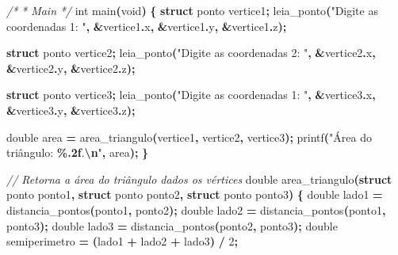 \documentclass[
  11pt,
  a4paper,
]{scrbook}
\newenvironment{Shaded}{\begin{snugshade}}{\end{snugshade}}
\newcommand{\CommentTok}[1]{\textcolor[rgb]{0.56,0.35,0.01}{\textit{#1}}}
\newcommand{\DataTypeTok}[1]{\textcolor[rgb]{0.13,0.29,0.53}{#1}}
\newcommand{\DecValTok}[1]{\textcolor[rgb]{0.00,0.00,0.81}{#1}}
\newcommand{\KeywordTok}[1]{\textcolor[rgb]{0.13,0.29,0.53}{\textbf{#1}}}
\newcommand{\NormalTok}[1]{#1}
\newcommand{\OperatorTok}[1]{\textcolor[rgb]{0.81,0.36,0.00}{\textbf{#1}}}
\newcommand{\SpecialCharTok}[1]{\textcolor[rgb]{0.81,0.36,0.00}{\textbf{#1}}}
\newcommand{\StringTok}[1]{\textcolor[rgb]{0.31,0.60,0.02}{#1}}
\begin{document}
\begin{Shaded}
\begin{Highlighting}[]
\CommentTok{/*}
\CommentTok{ * Main}
\CommentTok{ */}
\DataTypeTok{int}\NormalTok{ main}\OperatorTok{(}\DataTypeTok{void}\OperatorTok{)} \OperatorTok{\{}
    \KeywordTok{struct}\NormalTok{ ponto vertice1}\OperatorTok{;}
\NormalTok{    leia\_ponto}\OperatorTok{(}\StringTok{"Digite as coordenadas 1: "}\OperatorTok{,} \OperatorTok{\&}\NormalTok{vertice1}\OperatorTok{.}\NormalTok{x}\OperatorTok{,} \OperatorTok{\&}\NormalTok{vertice1}\OperatorTok{.}\NormalTok{y}\OperatorTok{,}
               \OperatorTok{\&}\NormalTok{vertice1}\OperatorTok{.}\NormalTok{z}\OperatorTok{);}

    \KeywordTok{struct}\NormalTok{ ponto vertice2}\OperatorTok{;}
\NormalTok{    leia\_ponto}\OperatorTok{(}\StringTok{"Digite as coordenadas 2: "}\OperatorTok{,} \OperatorTok{\&}\NormalTok{vertice2}\OperatorTok{.}\NormalTok{x}\OperatorTok{,} \OperatorTok{\&}\NormalTok{vertice2}\OperatorTok{.}\NormalTok{y}\OperatorTok{,}
               \OperatorTok{\&}\NormalTok{vertice2}\OperatorTok{.}\NormalTok{z}\OperatorTok{);}

    \KeywordTok{struct}\NormalTok{ ponto vertice3}\OperatorTok{;}
\NormalTok{    leia\_ponto}\OperatorTok{(}\StringTok{"Digite as coordenadas 1: "}\OperatorTok{,} \OperatorTok{\&}\NormalTok{vertice3}\OperatorTok{.}\NormalTok{x}\OperatorTok{,} \OperatorTok{\&}\NormalTok{vertice3}\OperatorTok{.}\NormalTok{y}\OperatorTok{,}
               \OperatorTok{\&}\NormalTok{vertice3}\OperatorTok{.}\NormalTok{z}\OperatorTok{);}

    \DataTypeTok{double}\NormalTok{ area }\OperatorTok{=}\NormalTok{ area\_triangulo}\OperatorTok{(}\NormalTok{vertice1}\OperatorTok{,}\NormalTok{ vertice2}\OperatorTok{,}\NormalTok{ vertice3}\OperatorTok{);}
\NormalTok{    printf}\OperatorTok{(}\StringTok{"Área do triângulo: }\SpecialCharTok{\%.2f}\StringTok{.}\SpecialCharTok{\textbackslash{}n}\StringTok{"}\OperatorTok{,}\NormalTok{ area}\OperatorTok{);}
\OperatorTok{\}}

\CommentTok{// Retorna a área do triângulo dados os vértices}
\DataTypeTok{double}\NormalTok{ area\_triangulo}\OperatorTok{(}\KeywordTok{struct}\NormalTok{ ponto ponto1}\OperatorTok{,}
                      \KeywordTok{struct}\NormalTok{ ponto ponto2}\OperatorTok{,}
                      \KeywordTok{struct}\NormalTok{ ponto ponto3}\OperatorTok{)} \OperatorTok{\{}
    \DataTypeTok{double}\NormalTok{ lado1 }\OperatorTok{=}\NormalTok{ distancia\_pontos}\OperatorTok{(}\NormalTok{ponto1}\OperatorTok{,}\NormalTok{ ponto2}\OperatorTok{);}
    \DataTypeTok{double}\NormalTok{ lado2 }\OperatorTok{=}\NormalTok{ distancia\_pontos}\OperatorTok{(}\NormalTok{ponto1}\OperatorTok{,}\NormalTok{ ponto3}\OperatorTok{);}
    \DataTypeTok{double}\NormalTok{ lado3 }\OperatorTok{=}\NormalTok{ distancia\_pontos}\OperatorTok{(}\NormalTok{ponto2}\OperatorTok{,}\NormalTok{ ponto3}\OperatorTok{);}
    \DataTypeTok{double}\NormalTok{ semiperimetro }\OperatorTok{=} \OperatorTok{(}\NormalTok{lado1 }\OperatorTok{+}\NormalTok{ lado2 }\OperatorTok{+}\NormalTok{ lado3}\OperatorTok{)} \OperatorTok{/} \DecValTok{2}\OperatorTok{;}


\end{Highlighting}
\end{Shaded}
\end{document}
